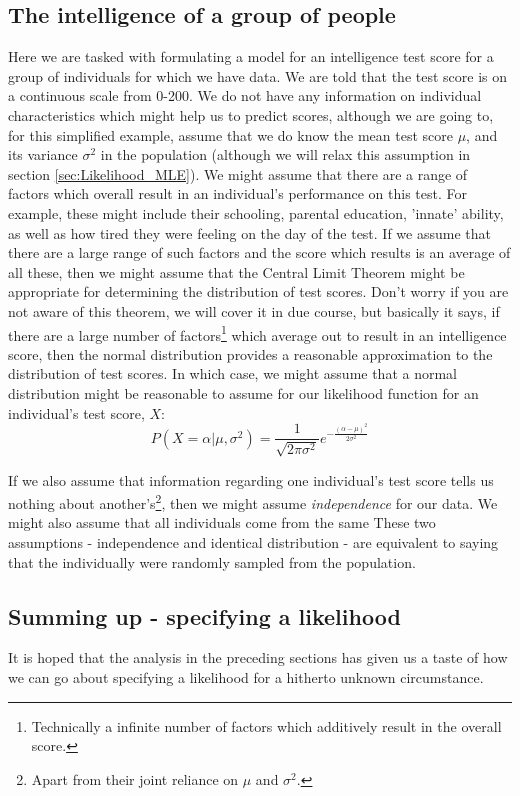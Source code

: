 \documentclass[11pt,fullpage]{book}
\begin{document}
\subsection{The intelligence of a group of people}
Here we are tasked with formulating a model for an intelligence test score for a group of individuals for which we have data. We are told that the test score is on a continuous scale from 0-200. We do not have any information on individual characteristics which might help us to predict scores, although we are going to, for this simplified example, assume that we do know the mean test score $\mu$, and its variance $\sigma^2$ in the population (although we will relax this assumption in section \ref{sec:Likelihood_MLE}). We might assume that there are a range of factors which overall result in an individual's performance on this test. For example, these might include their schooling, parental education, 'innate' ability, as well as how tired they were feeling on the day of the test. If we assume that there are a large range of such factors and the score which results is an average of all these, then we might assume that the Central Limit Theorem might be appropriate for determining the distribution of test scores. Don't worry if you are not aware of this theorem, we will cover it in due course, but basically it says, if there are a large number of factors\footnote{Technically a infinite number of factors which additively result in the overall score.} which average out to result in an intelligence score, then the normal distribution provides a reasonable approximation to the distribution of test scores. In which case, we might assume that a normal distribution might be reasonable to assume for our likelihood function for an individual's test score, $X$:\\

\begin{equation}
P(X=\alpha|\mu,\sigma^2) = \frac{1}{\sqrt{2\pi\sigma^2}}e^{-\frac{(\alpha-\mu)^2}{2\sigma^2}}
\end{equation}\label{eq:Likelihood_normal}

If we also assume that information regarding one individual's test score tells us nothing about another's\footnote{Apart from their joint reliance on $\mu$ and $\sigma^2$.}, then we might assume \textit{independence} for our data. We might also assume that all individuals come from the same  These two assumptions - independence and identical distribution - are equivalent to saying that the individually were randomly sampled from the population. 
\subsection{Summing up - specifying a likelihood}
It is hoped that the analysis in the preceding sections has given us a taste of how we can go about specifying a likelihood for a hitherto unknown circumstance. 
\end{document}
